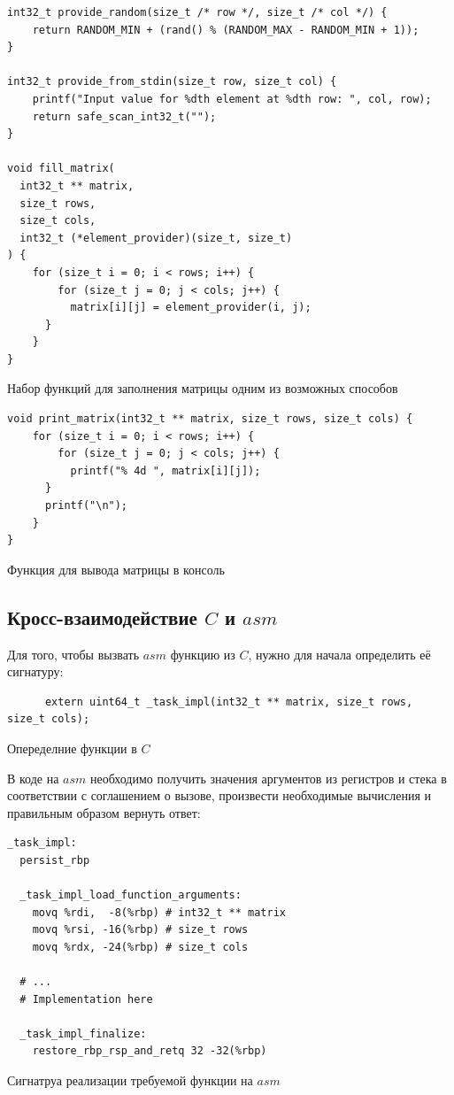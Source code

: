 \documentclass[a4paper]{article}
\begin{document}
  \begin{listing}[H]
    \begin{verbatim}
int32_t provide_random(size_t /* row */, size_t /* col */) {
    return RANDOM_MIN + (rand() % (RANDOM_MAX - RANDOM_MIN + 1));
}

int32_t provide_from_stdin(size_t row, size_t col) {
    printf("Input value for %dth element at %dth row: ", col, row);
    return safe_scan_int32_t("");
}

void fill_matrix(
  int32_t ** matrix,
  size_t rows,
  size_t cols,
  int32_t (*element_provider)(size_t, size_t)
) {
    for (size_t i = 0; i < rows; i++) {
        for (size_t j = 0; j < cols; j++) {
          matrix[i][j] = element_provider(i, j);
      }
    }
}
    \end{verbatim}
    \caption{Набор функций для заполнения матрицы одним из возможных способов}
  \end{listing}

  \begin{listing}[H]
    \begin{verbatim}
void print_matrix(int32_t ** matrix, size_t rows, size_t cols) {
    for (size_t i = 0; i < rows; i++) {
        for (size_t j = 0; j < cols; j++) {
          printf("% 4d ", matrix[i][j]);
      }
      printf("\n");
    }
}
    \end{verbatim}
    \caption{Функция для вывода матрицы в консоль}
  \end{listing}

  \subsection{Кросс-взаимодействие $C$ и $asm$}

  Для того, чтобы вызвать $asm$ функцию из $C$, нужно для начала определить её сигнатуру:
  \begin{listing}[H]
    \begin{verbatim}
      extern uint64_t _task_impl(int32_t ** matrix, size_t rows, size_t cols);
    \end{verbatim}
    \caption{Опеределние функции в $C$}
  \end{listing}

  В коде на $asm$ необходимо получить значения аргументов из регистров и стека
  в соответствии с соглашением о вызове, произвести необходимые вычисления и правильным
  образом вернуть ответ:
  \begin{listing}[H]
    \begin{verbatim}
_task_impl:
  persist_rbp 
 
  _task_impl_load_function_arguments:
    movq %rdi,  -8(%rbp) # int32_t ** matrix
    movq %rsi, -16(%rbp) # size_t rows
    movq %rdx, -24(%rbp) # size_t cols

  # ...
  # Implementation here

  _task_impl_finalize:  
    restore_rbp_rsp_and_retq 32 -32(%rbp)
    \end{verbatim}
    \caption{Сигнатруа реализации требуемой функции на $asm$}
  \end{listing}
\end{document}

